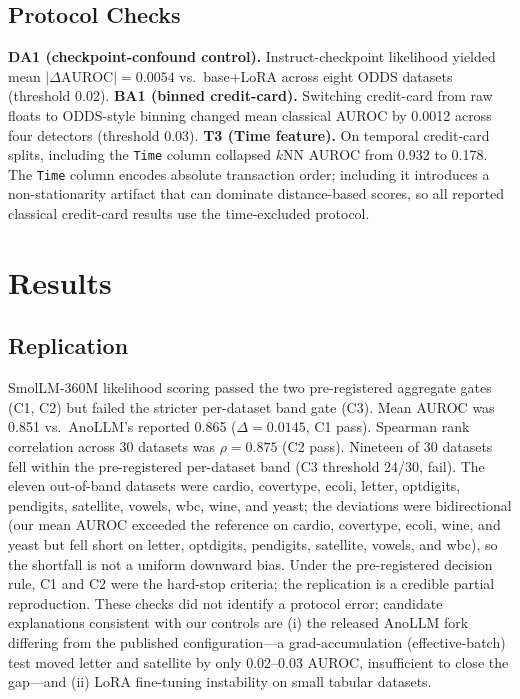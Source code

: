 \documentclass[conference]{IEEEtran}
\begin{document}
\subsection{Protocol Checks}
\textbf{DA1 (checkpoint-confound control).} Instruct-checkpoint likelihood yielded mean $|\Delta\mathrm{AUROC}|=0.0054$ vs.\ base+LoRA across eight ODDS datasets (threshold 0.02).
\textbf{BA1 (binned credit-card).} Switching credit-card from raw floats to ODDS-style binning changed mean classical AUROC by 0.0012 across four detectors (threshold 0.03).
\textbf{T3 (Time feature).} On temporal credit-card splits, including the \texttt{Time} column collapsed $k$NN AUROC from 0.932 to 0.178.
The \texttt{Time} column encodes absolute transaction order; including it introduces a non-stationarity artifact that can dominate distance-based scores, so all reported classical credit-card results use the time-excluded protocol.

\section{Results}\label{sec:results}

\subsection{Replication}\label{subsec:replication}
SmolLM-360M likelihood scoring passed the two pre-registered aggregate gates (C1, C2) but failed the stricter per-dataset band gate (C3).
Mean AUROC was 0.851 vs.\ AnoLLM's reported 0.865 ($\Delta=0.0145$, C1 pass).
Spearman rank correlation across 30 datasets was $\rho=0.875$ (C2 pass).
Nineteen of 30 datasets fell within the pre-registered per-dataset band (C3 threshold 24/30, fail).
The eleven out-of-band datasets were cardio, covertype, ecoli, letter, optdigits, pendigits, satellite, vowels, wbc, wine, and yeast; the deviations were bidirectional (our mean AUROC exceeded the reference on cardio, covertype, ecoli, wine, and yeast but fell short on letter, optdigits, pendigits, satellite, vowels, and wbc), so the shortfall is not a uniform downward bias.
Under the pre-registered decision rule, C1 and C2 were the hard-stop criteria; the replication is a credible partial reproduction.
These checks did not identify a protocol error; candidate explanations consistent with our controls are (i) the released AnoLLM fork differing from the published configuration---a grad-accumulation (effective-batch) test moved letter and satellite by only 0.02--0.03 AUROC, insufficient to close the gap---and (ii) LoRA fine-tuning instability on small tabular datasets.
\end{document}
